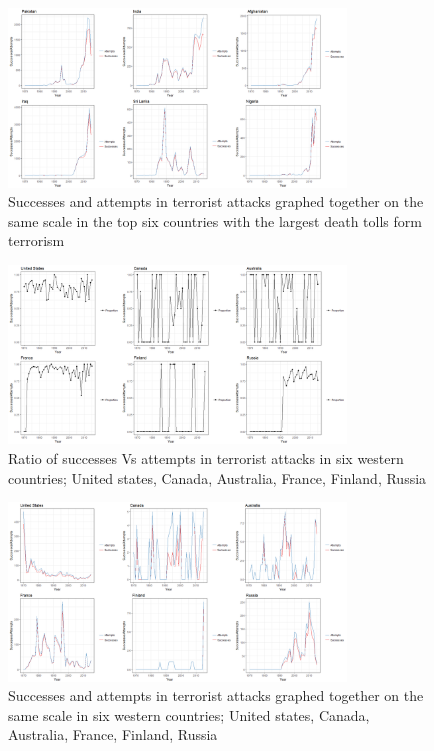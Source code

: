 \documentclass[10pt,a4paper]{article}
\begin{document}
\begin{center}
\begin{figure}[h!]
	\includegraphics[width=0.8\textwidth]{Plots/OverTime/Top6SuccessVsAttempts.png}
	\caption{Successes and attempts in terrorist attacks graphed together on the same scale in the top six countries with the largest death tolls form terrorism}

\end{figure}

\begin{figure}[h!]
		
	\includegraphics[width=0.8\textwidth]{Plots/OverTime/WesternProportionSuccessAttempts.png}
	\caption{Ratio of successes Vs attempts in terrorist attacks in six western countries; United states, Canada, Australia, France, Finland, Russia}

\end{figure}

\begin{figure}[h!]
		
	\includegraphics[width=0.8\textwidth]{Plots/OverTime/WesternSuccessVsAttempts.png}
	\caption{Successes and attempts in terrorist attacks graphed together on the same scale in six western countries; United states, Canada, Australia, France, Finland, Russia}


\end{figure}
	
\end{center}
\end{document}
